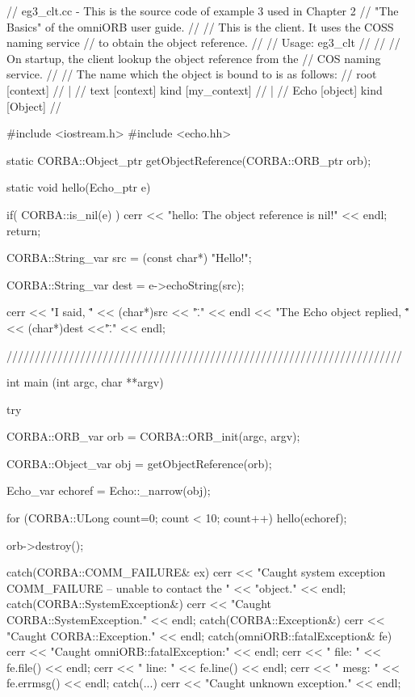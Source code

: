 \documentclass[11pt,twoside,a4paper]{book}
\begin{document}
\begin{cxxlisting}
// eg3_clt.cc - This is the source code of example 3 used in Chapter 2
//              "The Basics" of the omniORB user guide.
//
//              This is the client. It uses the COSS naming service
//              to obtain the object reference.
//
// Usage: eg3_clt
//
//
//        On startup, the client lookup the object reference from the
//        COS naming service.
//
//        The name which the object is bound to is as follows:
//              root  [context]
//               |
//              text  [context] kind [my_context]
//               |
//              Echo  [object]  kind [Object]
//

#include <iostream.h>
#include <echo.hh>

static CORBA::Object_ptr getObjectReference(CORBA::ORB_ptr orb);

static void hello(Echo_ptr e)
{
  if( CORBA::is_nil(e) ) {
    cerr << "hello: The object reference is nil!\n" << endl;
    return;
  }

  CORBA::String_var src = (const char*) "Hello!";

  CORBA::String_var dest = e->echoString(src);

  cerr << "I said, \"" << (char*)src << "\"." << endl
       << "The Echo object replied, \"" << (char*)dest <<"\"." << endl;
}

//////////////////////////////////////////////////////////////////////

int
main (int argc, char **argv) 
{
  try {
    CORBA::ORB_var orb = CORBA::ORB_init(argc, argv);

    CORBA::Object_var obj = getObjectReference(orb);

    Echo_var echoref = Echo::_narrow(obj);

    for (CORBA::ULong count=0; count < 10; count++)
      hello(echoref);

    orb->destroy();
  }
  catch(CORBA::COMM_FAILURE& ex) {
    cerr << "Caught system exception COMM_FAILURE -- unable to contact the "
         << "object." << endl;
  }
  catch(CORBA::SystemException&) {
    cerr << "Caught CORBA::SystemException." << endl;
  }
  catch(CORBA::Exception&) {
    cerr << "Caught CORBA::Exception." << endl;
  }
  catch(omniORB::fatalException& fe) {
    cerr << "Caught omniORB::fatalException:" << endl;
    cerr << "  file: " << fe.file() << endl;
    cerr << "  line: " << fe.line() << endl;
    cerr << "  mesg: " << fe.errmsg() << endl;
  }
  catch(...) {
    cerr << "Caught unknown exception." << endl;
  }

}
\end{cxxlisting}
\end{document}
